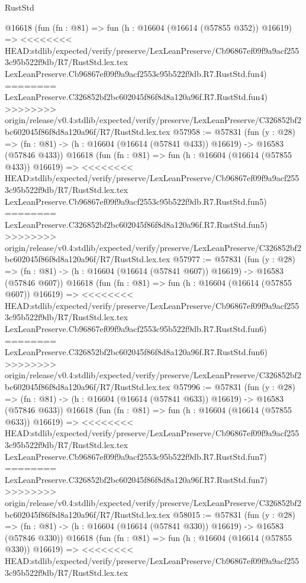 \begin{lexlean}{RustStd}
\begin{coremodule}
{\begin{coremodule}
{{{{{{{{{{{{{{{{{{{{{{{{{{{{{{{{{{{{{{{{{{{{{{{{{{{{{{{    @16618
    (fun (fn : @81) =>
    fun (h : @16604 (@16614 (@57855 @352)) @16619) =>
<<<<<<<< HEAD:stdlib/expected/verify/preserve/LexLeanPreserve/Cb96867ef09f9a9acf2553c95b522f9db/R7/RustStd.lex.tex
    LexLeanPreserve.Cb96867ef09f9a9acf2553c95b522f9db.R7.RustStd.fun4)
========
    LexLeanPreserve.C326852bf2bc602045f86f8d8a120a96f.R7.RustStd.fun4)
>>>>>>>> origin/release/v0.4:stdlib/expected/verify/preserve/LexLeanPreserve/C326852bf2bc602045f86f8d8a120a96f/R7/RustStd.lex.tex
@57958 := @57831
    (fun (y : @28) =>
    (fn : @81) -> (h : @16604 (@16614 (@57841 @433)) @16619) -> @16583 (@57846 @433))
    @16618
    (fun (fn : @81) =>
    fun (h : @16604 (@16614 (@57855 @433)) @16619) =>
<<<<<<<< HEAD:stdlib/expected/verify/preserve/LexLeanPreserve/Cb96867ef09f9a9acf2553c95b522f9db/R7/RustStd.lex.tex
    LexLeanPreserve.Cb96867ef09f9a9acf2553c95b522f9db.R7.RustStd.fun5)
========
    LexLeanPreserve.C326852bf2bc602045f86f8d8a120a96f.R7.RustStd.fun5)
>>>>>>>> origin/release/v0.4:stdlib/expected/verify/preserve/LexLeanPreserve/C326852bf2bc602045f86f8d8a120a96f/R7/RustStd.lex.tex
@57977 := @57831
    (fun (y : @28) =>
    (fn : @81) -> (h : @16604 (@16614 (@57841 @607)) @16619) -> @16583 (@57846 @607))
    @16618
    (fun (fn : @81) =>
    fun (h : @16604 (@16614 (@57855 @607)) @16619) =>
<<<<<<<< HEAD:stdlib/expected/verify/preserve/LexLeanPreserve/Cb96867ef09f9a9acf2553c95b522f9db/R7/RustStd.lex.tex
    LexLeanPreserve.Cb96867ef09f9a9acf2553c95b522f9db.R7.RustStd.fun6)
========
    LexLeanPreserve.C326852bf2bc602045f86f8d8a120a96f.R7.RustStd.fun6)
>>>>>>>> origin/release/v0.4:stdlib/expected/verify/preserve/LexLeanPreserve/C326852bf2bc602045f86f8d8a120a96f/R7/RustStd.lex.tex
@57996 := @57831
    (fun (y : @28) =>
    (fn : @81) -> (h : @16604 (@16614 (@57841 @633)) @16619) -> @16583 (@57846 @633))
    @16618
    (fun (fn : @81) =>
    fun (h : @16604 (@16614 (@57855 @633)) @16619) =>
<<<<<<<< HEAD:stdlib/expected/verify/preserve/LexLeanPreserve/Cb96867ef09f9a9acf2553c95b522f9db/R7/RustStd.lex.tex
    LexLeanPreserve.Cb96867ef09f9a9acf2553c95b522f9db.R7.RustStd.fun7)
========
    LexLeanPreserve.C326852bf2bc602045f86f8d8a120a96f.R7.RustStd.fun7)
>>>>>>>> origin/release/v0.4:stdlib/expected/verify/preserve/LexLeanPreserve/C326852bf2bc602045f86f8d8a120a96f/R7/RustStd.lex.tex
@58015 := @57831
    (fun (y : @28) =>
    (fn : @81) -> (h : @16604 (@16614 (@57841 @330)) @16619) -> @16583 (@57846 @330))
    @16618
    (fun (fn : @81) =>
    fun (h : @16604 (@16614 (@57855 @330)) @16619) =>
<<<<<<<< HEAD:stdlib/expected/verify/preserve/LexLeanPreserve/Cb96867ef09f9a9acf2553c95b522f9db/R7/RustStd.lex.tex
}}}}}}}}}}}}}}}}}}}}}}}}}}}}}}}}}}}}}}}}}}}}}}}}}}}}}}}
\end{coremodule}}
\end{coremodule}
\end{lexlean}

